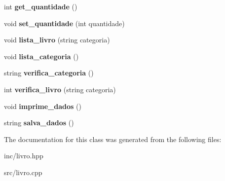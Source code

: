 \begin{DoxyCompactItemize}
\mbox{\label{class_livro_ade24f1e83c1b0bcb26845e4dc7e2112b}} 
int {\bfseries get\+\_\+quantidade} ()
\item 
\mbox{\label{class_livro_a862ad3d2c1d7754e347b84f633b0cd58}} 
void {\bfseries set\+\_\+quantidade} (int quantidade)
\item 
\mbox{\label{class_livro_a0697d3698bca92189fa6c3cce8dc8e39}} 
void {\bfseries lista\+\_\+livro} (string categoria)
\item 
\mbox{\label{class_livro_a50ab2684b4334261df00886c755cfd9d}} 
void {\bfseries lista\+\_\+categoria} ()
\item 
\mbox{\label{class_livro_afa685bdc099394ffd94e0f70ef6de500}} 
string {\bfseries verifica\+\_\+categoria} ()
\item 
\mbox{\label{class_livro_a27d660e47fe333768d96ed7186923c74}} 
int {\bfseries verifica\+\_\+livro} (string categoria)
\item 
\mbox{\label{class_livro_ad8bf1a52295d2c5b7f696c4956f43e7c}} 
void {\bfseries imprime\+\_\+dados} ()
\item 
\mbox{\label{class_livro_abb1d98a0c48f6bde82fc31dbcf1fe38d}} 
string {\bfseries salva\+\_\+dados} ()
\end{DoxyCompactItemize}


The documentation for this class was generated from the following files\+:\begin{DoxyCompactItemize}
\item 
inc/livro.\+hpp\item 
src/livro.\+cpp\end{DoxyCompactItemize}
